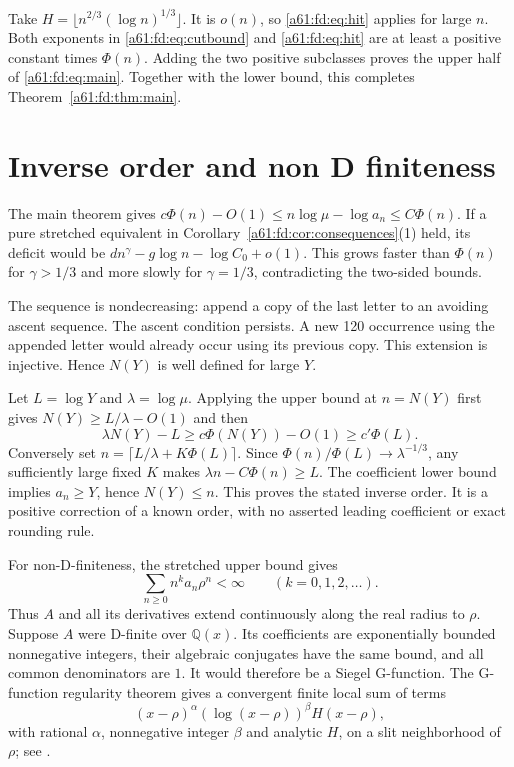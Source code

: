 \documentclass[11pt,letterpaper]{article}
\numberwithin{equation}{section}
\theoremstyle{remark}\newtheorem{remark}[theorem]{Remark}
\newcommand{\Q}{\mathbb Q}
\begin{document}
Take $H=\lfloor n^{2/3}(\log n)^{1/3}\rfloor$. It is $o(n)$, so \eqref{a61:fd:eq:hit} applies for large $n$. Both exponents in \eqref{a61:fd:eq:cutbound} and \eqref{a61:fd:eq:hit} are at least a positive constant times $\Phi(n)$. Adding the two positive subclasses proves the upper half of \eqref{a61:fd:eq:main}. Together with the lower bound, this completes Theorem~\ref{a61:fd:thm:main}.

\section{Inverse order and non D finiteness}\label{a61:fd:sec:nondfinite}
The main theorem gives $c\Phi(n)-O(1)\le n\log\mu-\log a_n\le C\Phi(n)$. If a pure stretched equivalent in Corollary~\ref{a61:fd:cor:consequences}(1) held, its deficit would be $dn^\gamma-g\log n-\log C_0+o(1)$. This grows faster than $\Phi(n)$ for $\gamma>1/3$ and more slowly for $\gamma=1/3$, contradicting the two-sided bounds.

The sequence is nondecreasing: append a copy of the last letter to an avoiding ascent sequence. The ascent condition persists. A new 120 occurrence using the appended letter would already occur using its previous copy. This extension is injective. Hence $N(Y)$ is well defined for large $Y$.

Let $L=\log Y$ and $\lambda=\log\mu$. Applying the upper bound at $n=N(Y)$ first gives $N(Y)\ge L/\lambda-O(1)$ and then
\[
 \lambda N(Y)-L\ge c\Phi(N(Y))-O(1)\ge c'\Phi(L).
\]
Conversely set $n=\lceil L/\lambda+K\Phi(L)\rceil$. Since $\Phi(n)/\Phi(L)\to\lambda^{-1/3}$, any sufficiently large fixed $K$ makes $\lambda n-C\Phi(n)\ge L$. The coefficient lower bound implies $a_n\ge Y$, hence $N(Y)\le n$. This proves the stated inverse order. It is a positive correction of a known order, with no asserted leading coefficient or exact rounding rule.

For non-D-finiteness, the stretched upper bound gives
\[
 \sum_{n\ge0}n^k a_n\rho^n<\infty\qquad(k=0,1,2,\ldots).
\]
Thus $A$ and all its derivatives extend continuously along the real radius to $\rho$. Suppose $A$ were D-finite over $\Q(x)$. Its coefficients are exponentially bounded nonnegative integers, their algebraic conjugates have the same bound, and all common denominators are $1$. It would therefore be a Siegel G-function. The G-function regularity theorem gives a convergent finite local sum of terms
\[
 (x-\rho)^\alpha(\log(x-\rho))^\beta H(x-\rho),
\]
with rational $\alpha$, nonnegative integer $\beta$ and analytic $H$, on a slit neighborhood of $\rho$; see \cite[Definition 2.2 and Theorem 2.1(c)]{GB}.
\end{document}

